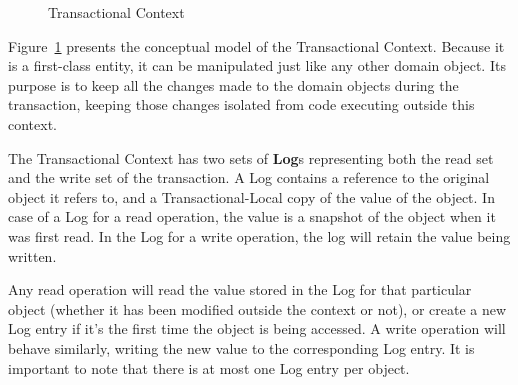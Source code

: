 \documentclass{llncs}
\begin{document}
\begin{figure}
  \centering

  \caption{Transactional Context}
  \label{fig:transactionalContext}

\end{figure}

Figure~\ref{fig:transactionalContext} presents the conceptual model of
the Transactional Context. Because it is a first-class entity, it can be
manipulated just like any other domain object. Its purpose is to keep
all the changes made to the domain objects during the transaction,
keeping those changes isolated from code executing outside this
context.

The Transactional Context has two sets of {\bf Log}s representing both
the read set and the write set of the transaction. A Log contains a
reference to the original object it refers to, and a
Transactional-Local copy of the value of the object. In case of a Log
for a read operation, the value is a snapshot of the object when it
was first read. In the Log for a write operation, the log will retain
the value being written.

Any read operation will read the value stored in the Log for that
particular object (whether it has been modified outside the context or
not), or create a new Log entry if it's the first time the object is
being accessed. A write operation will behave similarly, writing the
new value to the corresponding Log entry. It is important to note that
there is at most one Log entry per object.
\end{document}
